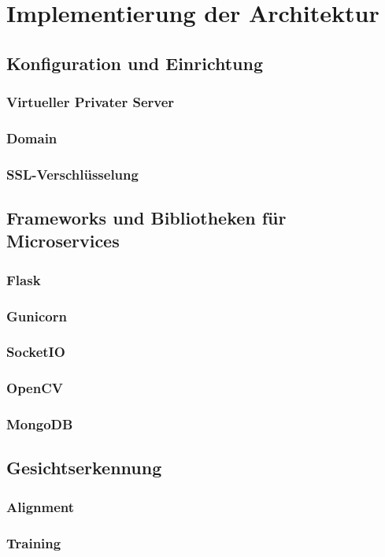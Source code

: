 \chapter{Implementierung der Architektur}

\section{Konfiguration und Einrichtung}
\subsection{Virtueller Privater Server}
\subsection{Domain}
\subsection{SSL-Verschlüsselung}


\section{Frameworks und Bibliotheken für Microservices}
\subsection{Flask}
\subsection{Gunicorn}
\subsection{SocketIO}
\subsection{OpenCV}
\subsection{MongoDB}

\section{Gesichtserkennung}
\subsection{Alignment}
\subsection{Training}
